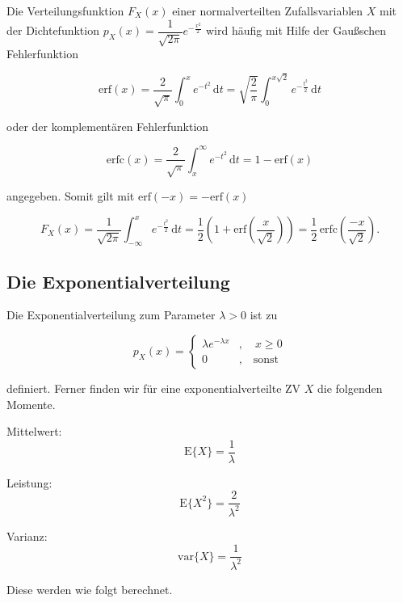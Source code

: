 
Die Verteilungsfunktion $F_X(x)$ einer normalverteilten Zufallsvariablen $X$ mit der Dichtefunktion $p_X(x) = \dfrac{1}{\sqrt{2\pi}} e^{-\frac{x^2}{2}}$ wird häufig mit Hilfe der Gaußschen Fehlerfunktion

$$
\mathrm{erf}(x) = \frac{2}{\sqrt{\pi}} \int_0^x e^{-t^2}\,\mathrm{d}t = \sqrt{\frac{2}{\pi}} \int_0^{x\sqrt{2}} e^{-\frac{t^2}{2}}\,\mathrm{d}t
$$

oder der komplementären Fehlerfunktion

$$
\mathrm{erfc}(x) = \frac{2}{\sqrt{\pi}} \int_x^{\infty} e^{-t^2}\,\mathrm{d}t = 1 - \mathrm{erf}(x)
$$

angegeben. Somit gilt mit $\mathrm{erf}(-x) = -\mathrm{erf}(x)$

$$
F_X(x) = \frac{1}{\sqrt{2\pi}} \int_{-\infty}^{x} e^{-\frac{t^2}{2}}\,\mathrm{d}t = \frac{1}{2}\!\left(1 + \mathrm{erf}\!\left(\frac{x}{\sqrt{2}}\right)\right) = \frac{1}{2}\,\mathrm{erfc}\!\left(\frac{-x}{\sqrt{2}}\right).
$$

\subsection{Die Exponentialverteilung}
\label{sec:exponentialverteilung}

\begin{definition}[Exponentialverteilung]
Die Exponentialverteilung zum Parameter $\lambda > 0$ ist zu

$$
p_X(x) = \begin{cases} \lambda e^{-\lambda x} & , \quad x \geq 0 \\ 0 & , \quad \text{sonst} \end{cases}
$$

definiert. Ferner finden wir für eine exponentialverteilte ZV $X$ die folgenden Momente.

Mittelwert:
$$
\mathrm{E}\{X\} = \frac{1}{\lambda}
$$

Leistung:
$$
\mathrm{E}\{X^2\} = \frac{2}{\lambda^2}
$$

Varianz:
$$
\mathrm{var}\{X\} = \frac{1}{\lambda^2}
$$
\end{definition}

Diese werden wie folgt berechnet.

